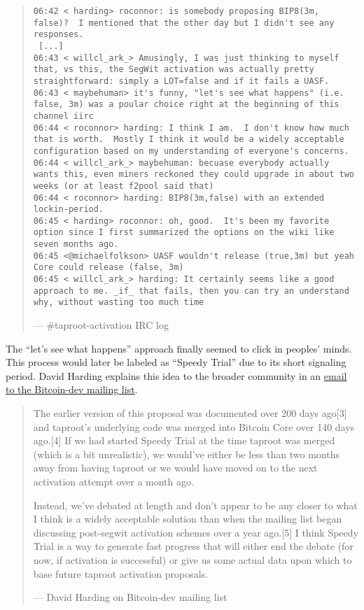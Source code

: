 \begin{quote}
\begin{verbatim}
06:42 < harding> roconnor: is somebody proposing BIP8(3m, false)?  I mentioned that the other day but I didn't see any responses.
 [...]
06:43 < willcl_ark_> Amusingly, I was just thinking to myself that, vs this, the SegWit activation was actually pretty straightforward: simply a LOT=false and if it fails a UASF.
06:43 < maybehuman> it's funny, "let's see what happens" (i.e. false, 3m) was a poular choice right at the beginning of this channel iirc
06:44 < roconnor> harding: I think I am.  I don't know how much that is worth.  Mostly I think it would be a widely acceptable configuration based on my understanding of everyone's concerns.
06:44 < willcl_ark_> maybehuman: becuase everybody actually wants this, even miners reckoned they could upgrade in about two weeks (or at least f2pool said that)
06:44 < roconnor> harding: BIP8(3m,false) with an extended lockin-period.
06:45 < harding> roconnor: oh, good.  It's been my favorite option since I first summarized the options on the wiki like seven months ago.
06:45 <@michaelfolkson> UASF wouldn't release (true,3m) but yeah Core could release (false, 3m)
06:45 < willcl_ark_> harding: It certainly seems like a good approach to me. _if_ that fails, then you can try an understand why, without wasting too much time
\end{verbatim}

---  \#taproot-activation IRC log
\end{quote}

The ``let's see what happens'' approach finally seemed to click in
peoples' minds. This process would later be labeled as ``Speedy Trial''
due to its short signaling period. David Harding explains this idea to
the broader community in an
\href{https://lists.linuxfoundation.org/pipermail/bitcoin-dev/2021-March/018583.html}{email
to the Bitcoin-dev mailing list}.

\begin{quote}
The earlier version of this proposal was documented over 200 days
ago{[}3{]} and taproot's underlying code was merged into Bitcoin Core
over 140 days ago.{[}4{]} If we had started Speedy Trial at the time
taproot was merged (which is a bit unrealistic), we would've either be
less than two months away from having taproot or we would have moved on
to the next activation attempt over a month ago.

Instead, we've debated at length and don't appear to be any closer to
what I think is a widely acceptable solution than when the mailing list
began discussing post-segwit activation schemes over a year ago.{[}5{]}
I think Speedy Trial is a way to generate fast progress that will either
end the debate (for now, if activation is successful) or give us some
actual data upon which to base future taproot activation proposals.

---  David Harding on Bitcoin-dev mailing list
\end{quote}

